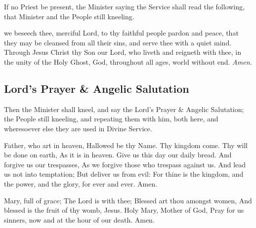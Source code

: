 \begin{rubric}
    If no Priest be present, the Minister saying the Service shall read the following, that Minister and the People still kneeling.
\end{rubric}
 we beseech thee, merciful Lord, to thy faithful people pardon and peace, that they may be cleansed from all their sins, and serve thee with a quiet mind. Through Jesus Christ thy Son our Lord, who liveth and reigneth with thee, in the unity of the Holy Ghost, God, throughout all ages, world without end. \textit{Amen.}

\subsection{Lord's Prayer \& Angelic Salutation}
\begin{rubric}
    Then the Minister shall kneel, and say the Lord's Prayer \& Angelic Salutation; the People still kneeling, and repeating them with him, both here, and wheresoever else they are used in Divine Service.
\end{rubric}

 Father, who art in heaven, Hallowed be thy Name. Thy kingdom come. Thy will be done on earth, As it is in heaven. Give us this day our daily bread. And forgive us our trespasses, As we forgive those who trespass against us. And lead us not into temptation; But deliver us from evil: For thine is the kingdom, and the power, and the glory, for ever and ever. Amen.

 Mary, full of grace; The Lord is with thee; Blessed art thou amongst women, And blessed is the fruit of thy womb, Jesus. Holy Mary, Mother of God, Pray for us sinners, now and at the hour of our death. Amen.
